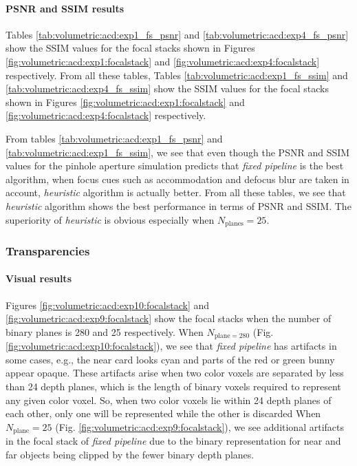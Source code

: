 




\paragraph{PSNR and SSIM results}
Tables \ref{tab:volumetric:acd:exp1_fs_psnr} and \ref{tab:volumetric:acd:exp4_fs_psnr} show the SSIM values for the focal stacks shown in Figures \ref{fig:volumetric:acd:exp1:focalstack} and \ref{fig:volumetric:acd:exp4:focalstack} respectively. From all these tables, 
Tables \ref{tab:volumetric:acd:exp1_fs_ssim} and \ref{tab:volumetric:acd:exp4_fs_ssim} show the SSIM values for the focal stacks shown in Figures \ref{fig:volumetric:acd:exp1:focalstack} and \ref{fig:volumetric:acd:exp4:focalstack} respectively. 

From tables \ref{tab:volumetric:acd:exp1_fs_psnr} and \ref{tab:volumetric:acd:exp1_fs_ssim}, we see that even though the PSNR and SSIM values for the pinhole aperture simulation predicts that \emph{fixed pipeline} is the best algorithm, when focus cues such as accommodation and defocus blur are taken in account, \emph{heuristic} algorithm is actually better. From all these tables, we see that \emph{heuristic} algorithm shows the best performance in terms of PSNR and SSIM. The superiority of \emph{heuristic} is obvious especially when $N_{\text{planes}} = 25$.

\subsubsection{Transparencies}


\paragraph{Visual results}
Figures \ref{fig:volumetric:acd:exp10:focalstack} and \ref{fig:volumetric:acd:exp9:focalstack} show the focal stacks when the number of binary planes is 280 and 25 respectively. 
When $N_{\text{plane}=280}$ (Fig. \ref{fig:volumetric:acd:exp10:focalstack}), we see that \emph{fixed pipeline} has artifacts in some cases, e.g., the near card looks cyan and parts of the red or green bunny appear opaque. 
These artifacts arise when two color voxels are separated by less than 24 depth planes, which is the length of binary voxels required to represent any given color voxel. So, when two color voxels lie within 24 depth planes of each other, only one will be represented while the other is discarded
When $N_{\text{plane}}=25$ (Fig. \ref{fig:volumetric:acd:exp9:focalstack}), we see additional artifacts in the focal stack of \emph{fixed pipeline} due to the binary representation for near and far objects being clipped by the fewer binary depth planes.  

